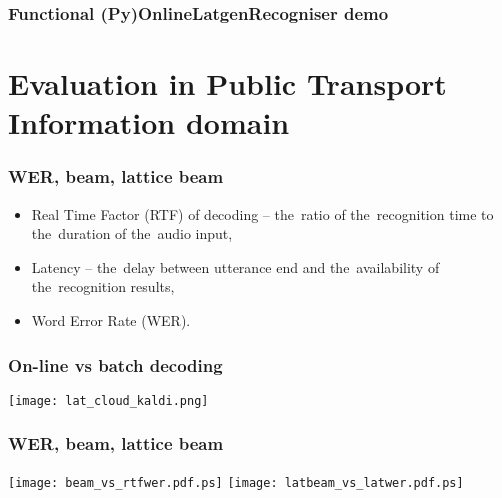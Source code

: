 \begin{frame}\frametitle{Functional (Py)OnlineLatgenRecogniser demo} 
    \begin{center}
        
    \end{center}
\end{frame}


\section[Evaluation in PTI]{Evaluation in Public Transport Information domain}%

\begin{frame}\frametitle{WER, beam, lattice beam} 
    \begin{itemize}
        \item Real Time Factor (RTF) of decoding -- the~ratio of the~recognition time to the~duration of the~audio input,
        \item Latency -- the~delay between utterance end and the~availability of the~recognition results,
        \item Word Error Rate (WER).
    \end{itemize}
\end{frame}

\begin{frame}\frametitle{On-line vs batch decoding} 
    \begin{center}
        \texttt{[image: lat\_cloud\_kaldi.png]}
    \end{center}
\end{frame}

\begin{frame}\frametitle{WER, beam, lattice beam} 
    \texttt{[image: beam\_vs\_rtfwer.pdf.ps]}
    \texttt{[image: latbeam\_vs\_latwer.pdf.ps]}
\end{frame}

